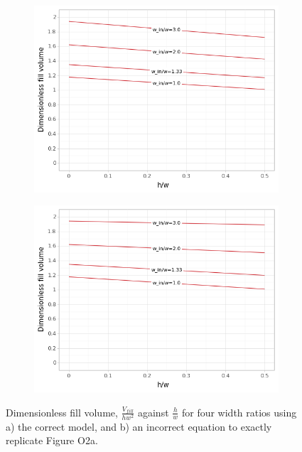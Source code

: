 \begin{figure}[ht]
  \centering
  \begin{subfigure}[b]{0.4\linewidth}
    \includegraphics[width=\linewidth]{../figures/fig_2a.png}
    \caption{}
    \label{fig2a}
  \end{subfigure}
  \begin{subfigure}[b]{0.4\linewidth}
    \includegraphics[width=\linewidth]{../figures/fig_2a_incorrect.png}
    \caption{}
    \label{fig2a_bad}
  \end{subfigure}
  \caption{Dimensionless fill volume, $\frac{V_{fill}}{hw^2}$ against $\frac{h}{w}$
  for four width ratios using a) the correct model, and b) an
  incorrect equation to exactly replicate Figure O2a.}
\end{figure}

